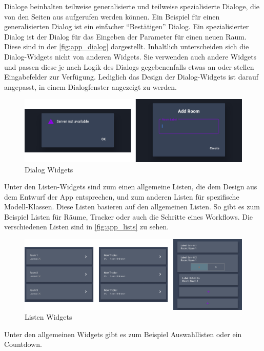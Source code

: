 Dialoge beinhalten teilweise generalisierte und teilweise spezialisierte Dialoge, die von den Seiten aus aufgerufen werden können.
Ein Beispiel für einen generalisierten Dialog ist ein einfacher \enquote{Bestätigen} Dialog.
Ein spezialisierter Dialog ist der Dialog für das Eingeben der Parameter für einen neuen Raum.
Diese sind in der \autoref{fig:app_dialog} dargestellt.
Inhaltlich unterscheiden sich die Dialog-Widgets nicht von anderen Widgets.
Sie verwenden auch andere Widgets und passen diese je nach Logik des Dialogs gegebenenfalls etwas an oder stellen
Eingabefelder zur Verfügung.
Lediglich das Design der Dialog-Widgets ist darauf angepasst, in einem Dialogfenster angezeigt zu werden.

\begin{figure}[htbp]
	\includegraphics[width=\textwidth]{images/app_dialog.png}
	\centering
	\caption{Dialog Widgets}
	\label{fig:app_dialog}
\end{figure}

Unter den Listen-Widgets sind zum einen allgemeine Listen, die dem Design aus dem Entwurf der App entsprechen, und zum
anderen Listen für spezifische Modell-Klassen.
Diese Listen basieren auf den allgemeinen Listen.
So gibt es zum Beispiel Listen für Räume, Tracker oder auch die Schritte eines Workflows.
Die verschiedenen Listen sind in \autoref{fig:app_lists} zu sehen.

\begin{figure}[htbp]
	\includegraphics[width=\textwidth]{images/app_lists.png}
	\centering
	\caption{Listen Widgets}
	\label{fig:app_lists}
\end{figure}

Unter den allgemeinen Widgets gibt es zum Beispiel Auswahllisten oder ein Countdown.

